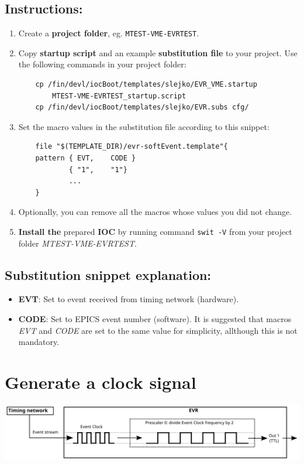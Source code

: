 \documentclass[12pt,a4paper]{article}
\begin{document}
\subsection{Instructions:}
\begin{enumerate}
	\item Create a \textbf{project folder}, eg. \texttt{MTEST-VME-EVRTEST}.
	\item Copy \textbf{startup script} and an example \textbf{substitution file} to your project. Use the following commands in your project folder:
\begin{verbatim}
	cp /fin/devl/iocBoot/templates/slejko/EVR_VME.startup 
	    MTEST-VME-EVRTEST_startup.script
	cp /fin/devl/iocBoot/templates/slejko/EVR.subs cfg/
\end{verbatim}
	\item Set the macro values in the substitution file according to this snippet:
\begin{verbatim}
	file "$(TEMPLATE_DIR)/evr-softEvent.template"{
	pattern { EVT,    CODE }
	        { "1",    "1"}
	        ...
	}
\end{verbatim}
	\item Optionally, you can remove all the macros whose values you did not change. 

	\item \textbf{Install the} prepared \textbf{IOC} by running command \texttt{swit -V} from your project folder \textit{MTEST-VME-EVRTEST}.
\end{enumerate}

\subsection{Substitution snippet explanation:}
\begin{itemize}
	\item \textbf{EVT}: Set to event received from timing network (hardware).
	\item \textbf{CODE}: Set to EPICS event number (software).
It is suggested that macros \textit{EVT} and \textit{CODE} are set to the same value for simplicity, allthough this is not mandatory.
\end{itemize}

\section{Generate a clock signal}
	\includegraphics[width=\columnwidth]{./img/prescaler}
\end{document}
